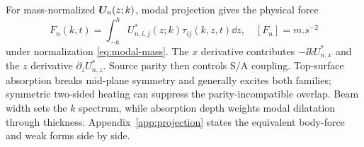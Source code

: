 For mass-normalized $\bm{U}_n(z;k)$, modal projection gives the physical force
\begin{equation}
 F_n(k,t)=\int_{-h}^{h}U_{n,i,j}^*(z;k)\tau_{ij}(k,z,t)\dd z,
 \quad [F_n]=\si{m.s^{-2}}
 \label{eq:physical-overlap}
\end{equation}
under normalization \cref{eq:modal-mass}. The $x$ derivative contributes
$-\ii kU_{n,x}^*$ and the $z$ derivative $\partial_zU_{n,z}^*$. Source parity
then controls S/A coupling. Top-surface absorption breaks mid-plane symmetry and
generally excites both families; symmetric two-sided heating can suppress the
parity-incompatible overlap. Beam width sets the $k$ spectrum, while absorption
depth weights modal dilatation through thickness. Appendix~\ref{app:projection}
states the equivalent body-force and weak forms side by side.
